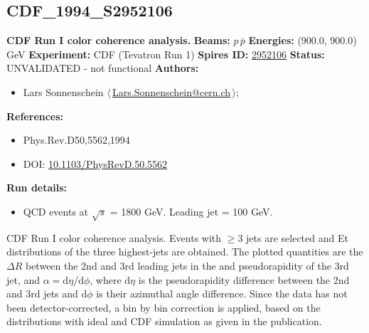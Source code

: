 \subsection[CDF\_1994\_S2952106]{CDF\_1994\_S2952106\,\cite{Abe:1994nj}}
\textbf{CDF Run I color coherence analysis.}\newline
\textbf{Beams:} $p$\,$\bar{p}$ \newline
\textbf{Energies:} (900.0, 900.0) GeV \newline
\textbf{Experiment:} CDF (Tevatron Run 1) \newline
\textbf{Spires ID:} \href{http://www.slac.stanford.edu/spires/find/hep/www?rawcmd=key+2952106}{2952106}\newline
\textbf{Status:} UNVALIDATED - not functional\newline
\textbf{Authors:}
\begin{itemize}
  \item Lars Sonnenschein $\langle\,$\href{mailto:Lars.Sonnenschein@cern.ch}{Lars.Sonnenschein@cern.ch}$\,\rangle$;
\end{itemize}
\textbf{References:}
\begin{itemize}
  \item Phys.Rev.D50,5562,1994
  \item DOI: \href{http://dx.doi.org/10.1103/PhysRevD.50.5562}{10.1103/PhysRevD.50.5562}
\end{itemize}
\textbf{Run details:}
\begin{itemize}

  \item QCD events at \ensuremath{\sqrt{s}} = 1800 GeV. Leading jet \pTmin = 100 GeV.\end{itemize}

\noindent CDF Run I color coherence analysis. Events with $\ge 3$ jets are selected and Et distributions of the three highest-\pT jets are obtained. The plotted quantities are the $\Delta{R}$ between the 2nd and 3rd leading jets in the \pT and pseudorapidity of the 3rd jet, and $\alpha = \mathrm{d}{\eta}/\mathrm{d}{\phi}$, where $\mathrm{d}{\eta}$ is the pseudorapidity difference between the 2nd and 3rd jets and $\mathrm{d}{\phi}$ is their azimuthal angle difference.  Since the data has not been detector-corrected, a bin by bin correction is applied, based on the distributions with ideal and CDF simulation as given in the publication.

\clearpage



